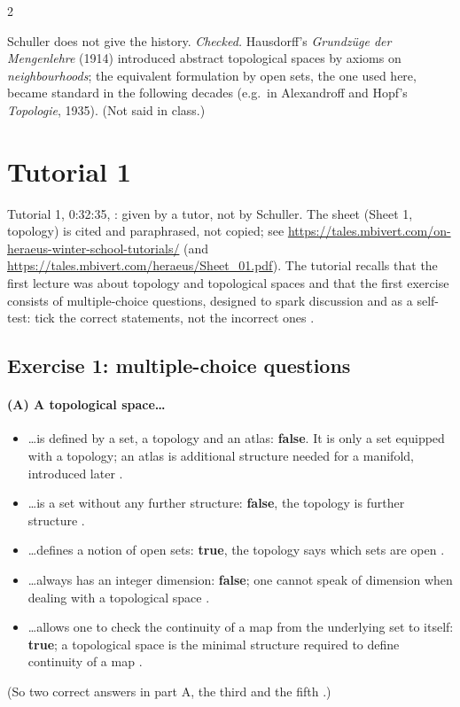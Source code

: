 \begin{paracol}{2}
\begin{history}
Schuller does not give the history. \emph{Checked.} Hausdorff's \emph{Grundz\"uge der Mengenlehre} (1914) introduced abstract topological spaces by axioms on
\emph{neighbourhoods}; the equivalent formulation by open sets, the one used here, became standard in the following decades (e.g.\ in Alexandroff and
Hopf's \emph{Topologie}, 1935). (Not said in class.)
\end{history}

\section{Tutorial 1}\label{sec:t01-1}

Tutorial 1, 0:32:35, : given by a tutor, not by Schuller. The sheet (Sheet 1, topology) is cited and paraphrased, not copied; see
\url{https://tales.mbivert.com/on-heraeus-winter-school-tutorials/} (and \url{https://tales.mbivert.com/heraeus/Sheet_01.pdf}). The tutorial recalls that the first lecture was about topology
and topological spaces and that the first exercise consists of multiple-choice questions, designed to spark discussion and as a self-test: tick the correct statements, not the incorrect
ones .

\subsection*{Exercise 1: multiple-choice questions}

\paragraph{(A) A topological space\dots}
\begin{itemize}
  \item \dots is defined by a set, a topology and an atlas: \textbf{false}. It is only a set equipped with a topology; an atlas is additional structure needed for a manifold, introduced later .
  \item \dots is a set without any further structure: \textbf{false}, the topology is further structure .
  \item \dots defines a notion of open sets: \textbf{true}, the topology says which sets are open .
  \item \dots always has an integer dimension: \textbf{false}; one cannot speak of dimension when dealing with a topological space .
  \item \dots allows one to check the continuity of a map from the underlying set to itself: \textbf{true}; a topological space is the minimal structure required to define continuity of a map
        .
\end{itemize}
(So two correct answers in part A, the third and the fifth .)


\end{paracol}
